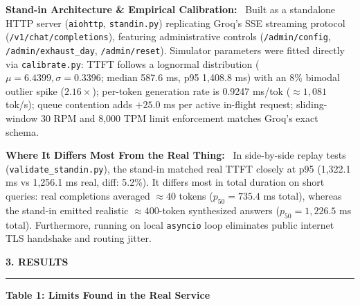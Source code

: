 \documentclass[10pt,a4paper]{article}
\newcommand{\secheader}[1]{\vspace{0.2em}\noindent\textbf{\small\MakeUppercase{#1}}\vspace{0.05em}\par\hrule\vspace{0.12em}}
\newcommand{\subhead}[1]{\noindent\textbf{#1}\ }
\begin{document}
\subhead{Stand-in Architecture \& Empirical Calibration:}
Built as a standalone HTTP server (\texttt{aiohttp}, \texttt{standin.py}) replicating Groq's SSE streaming protocol (\texttt{/v1/chat/completions}), featuring administrative controls (\texttt{/admin/config}, \texttt{/admin/exhaust\_day}, \texttt{/admin/reset}). Simulator parameters were fitted directly via \texttt{calibrate.py}:
TTFT follows a lognormal distribution ($\mu = 6.4399, \sigma = 0.3396$; median 587.6 ms, p95 1,408.8 ms) with an 8\% bimodal outlier spike ($2.16\times$); per-token generation rate is 0.9247 ms/tok ($\approx 1,081$ tok/s); queue contention adds $+25.0$ ms per active in-flight request; sliding-window 30 RPM and 8,000 TPM limit enforcement matches Groq's exact schema.

\subhead{Where It Differs Most From the Real Thing:}
In side-by-side replay tests (\texttt{validate\_standin.py}), the stand-in matched real TTFT closely at p95 (1,322.1 ms vs 1,256.1 ms real, diff: 5.2\%). It differs most in total duration on short queries: real completions averaged $\approx 40$ tokens ($p_{50} = 735.4$ ms total), whereas the stand-in emitted realistic $\approx 400$-token synthesized answers ($p_{50} = 1,226.5$ ms total). Furthermore, running on local \texttt{asyncio} loop eliminates public internet TLS handshake and routing jitter.

\secheader{3. Results}

\noindent\textbf{Table 1: Limits Found in the Real Service}\\[0.05em]
\vspace{0.15em}
\end{document}

